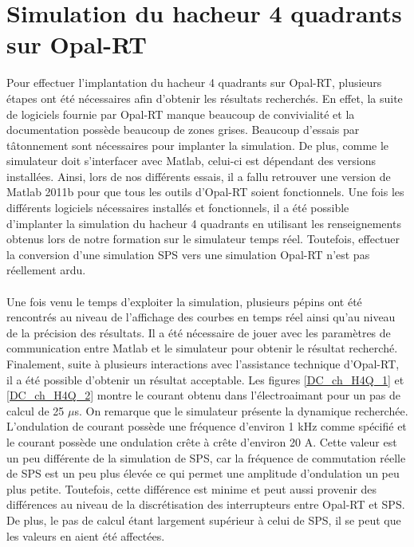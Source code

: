 \section{Simulation du hacheur 4 quadrants sur Opal-RT}
Pour effectuer l'implantation du hacheur 4 quadrants sur Opal-RT, plusieurs étapes ont été nécessaires afin d'obtenir les résultats recherchés. En effet, la suite de logiciels fournie par Opal-RT manque beaucoup de convivialité et la documentation possède beaucoup de zones grises. Beaucoup d'essais par tâtonnement sont nécessaires pour implanter la simulation. De plus, comme le simulateur doit s'interfacer avec Matlab, celui-ci est dépendant des versions installées. Ainsi, lors de nos différents essais, il a fallu retrouver une version de Matlab 2011b pour que tous les outils d'Opal-RT soient fonctionnels. Une fois les différents logiciels nécessaires installés et fonctionnels, il a été possible d'implanter la simulation du hacheur 4 quadrants en utilisant les renseignements obtenus lors de notre formation sur le simulateur temps réel. Toutefois, effectuer la conversion d'une simulation SPS vers une simulation Opal-RT n'est pas réellement ardu. 

\paragraph{} Une fois venu le temps d'exploiter la simulation, plusieurs pépins ont été rencontrés au niveau de l'affichage des courbes en temps réel ainsi qu'au niveau de la précision des résultats. Il a été nécessaire de jouer avec les paramètres de communication entre Matlab et le simulateur pour obtenir le résultat recherché. Finalement, suite à plusieurs interactions avec l'assistance technique d'Opal-RT, il a été possible d'obtenir un résultat acceptable. Les figures \ref{DC_ch_H4Q_1} et \ref{DC_ch_H4Q_2} montre le courant obtenu dans l'électroaimant pour un pas de calcul de 25 $\mu$s. On remarque que le simulateur présente la dynamique recherchée. L'ondulation de courant possède une fréquence d'environ 1 kHz comme spécifié et le courant possède une ondulation crête à crête d'environ 20 A. Cette valeur est un peu différente de la simulation de SPS, car la fréquence de commutation réelle de SPS est un peu plus élevée ce qui permet une amplitude d'ondulation un peu plus petite. Toutefois, cette différence est minime et peut aussi provenir des différences au niveau de la discrétisation des interrupteurs entre Opal-RT et SPS. De plus, le pas de calcul étant largement supérieur à celui de SPS, il se peut que les valeurs en aient été affectées. 

